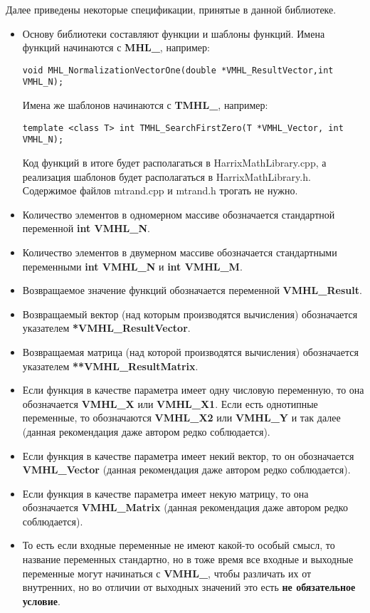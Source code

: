 \documentclass[a4paper,12pt]{article}
\begin{document}
Далее приведены некоторые спецификации, принятые в данной библиотеке.
\begin{itemize}
\item Основу библиотеки составляют функции и шаблоны функций. Имена функций начинаются с \textbf{MHL\_}, например:
\begin{lstlisting}[label=examplename,caption=Пример названия функции]
void MHL_NormalizationVectorOne(double *VMHL_ResultVector,int VMHL_N);
\end{lstlisting}
Имена же шаблонов начинаются с \textbf{TMHL\_}, например:
\begin{lstlisting}[label=examplename2,caption=Пример названия шаблона функции]
template <class T> int TMHL_SearchFirstZero(T *VMHL_Vector, int VMHL_N);
\end{lstlisting}
Код функций в итоге будет располагаться в HarrixMathLibrary.cpp, а реализация шаблонов будет располагаться в HarrixMathLibrary.h. Содержимое файлов mtrand.cpp и mtrand.h трогать не нужно.
\item Количество элементов в одномерном массиве обозначается стандартной переменной  \textbf{int VMHL\_N}.
\item Количество элементов в двумерном массиве обозначается стандартными переменными  \textbf{int VMHL\_N} и \textbf{int VMHL\_M}.
\item Возвращаемое значение функций обозначается переменной \textbf{VMHL\_Result}.
\item Возвращаемый вектор (над которым производятся вычисления) обозначается указателем \textbf{*VMHL\_ResultVector}.
\item Возвращаемая матрица (над которой производятся вычисления) обозначается указателем \textbf{**VMHL\_ResultMatrix}.
\item Если функция в качестве параметра имеет одну числовую переменную, то она обозначается \textbf{VMHL\_X} или \textbf{VMHL\_X1}. Если есть однотипные переменные, то обозначаются \textbf{VMHL\_X2} или \textbf{VMHL\_Y} и так далее (данная рекомендация даже автором редко соблюдается).
\item Если функция в качестве параметра имеет некий вектор, то он обозначается \textbf{VMHL\_Vector} (данная рекомендация даже автором редко соблюдается).
\item Если функция в качестве параметра имеет некую матрицу, то она обозначается \textbf{VMHL\_Matrix} (данная рекомендация даже автором редко соблюдается).
\item То есть если входные переменные не имеют какой-то особый смысл, то название переменных стандартно, но в тоже время все входные и выходные переменные могут начинаться с \textbf{VMHL\_}, чтобы различать их от внутренних, но во отличии от выходных значений это есть \textbf{не обязательное условие}.
\end{itemize}
\end{document}
